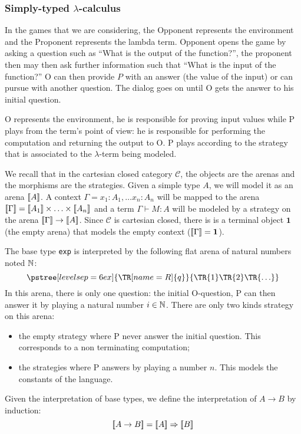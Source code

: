 \subsubsection{Simply-typed $\lambda$-calculus}

In the games that we are considering, the Opponent represents the environment and
the Proponent represents the lambda term. Opponent opens the game by asking a question
such as ``What is the output of the function?'', the proponent then may then ask further information such that ``What is the input of the function?''
O can then provide $P$ with an answer (the value of the input) or can pursue with another question. The dialog goes on until O gets the answer to his
initial question.

O represents the environment, he is responsible for proving input values while P plays from the term's point of view: he is responsible for performing
the computation and returning the output to O. P plays according to the strategy that is associated to the $\lambda$-term being modeled.

We recall that in the cartesian closed category $\mathcal{C}$, the objects are the arenas and the morphisms are the strategies.
Given a simple type $A$, we will model it as an arena ${[\![ A ]\!]}$.
A context $\Gamma = x_1 :A_1, \ldots x_n:A_n$ will be mapped to the arena
${[\![ \Gamma ]\!]} = {[\![ A_1 ]\!]} \times \ldots \times {[\![A_n ]\!]}$ and a term $\Gamma \vdash M : A$
will be modeled by a strategy on the arena ${[\![ \Gamma ]\!]} \rightarrow {[\![A ]\!]}$.
Since $\mathcal{C}$ is cartesian closed, there is is a terminal object $\textbf{1}$ (the empty arena) that
models the empty context (${[\![ \Gamma ]\!]} = \textbf{1}$).


The base type \texttt{exp} is interpreted by the following flat arena of natural numbers noted $\mathbb{N}$:
$$  \pstree[levelsep=6ex]
    {\TR[name=R]{q}}
    { \TR{1} \TR{2} \TR{\ldots}
    }
$$
In this arena, there is only one question: the initial O-question, P can then answer it by playing a natural number $i \in \mathbb{N}$.
There are only two kinds strategy on this arena:
\begin{itemize}
\item the empty strategy where P never answer the initial question. This corresponds to a non terminating computation;
\item the strategies where P answers by playing a number $n$. This models the constants of the language.
\end{itemize}

Given the interpretation of base types, we define the interpretation of $A\rightarrow B$ by induction:
$${[\![ A \rightarrow B ]\!]} = {[\![ A ]\!]} \Rightarrow {[\![B ]\!]}$$

